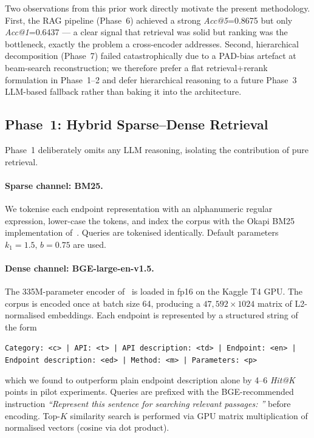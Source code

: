\documentclass[10pt,a4paper,twocolumn]{article}
\begin{document}
Two observations from this prior work directly motivate the present
methodology. First, the RAG pipeline (Phase~6) achieved a strong
\emph{Acc@5}=0.8675 but only \emph{Acc@1}=0.6437 --- a clear signal
that retrieval was solid but ranking was the bottleneck, exactly the
problem a cross-encoder addresses. Second, hierarchical decomposition
(Phase~7) failed catastrophically due to a PAD-bias artefact at
beam-search reconstruction; we therefore prefer a flat
retrieval+rerank formulation in Phase~1--2 and defer hierarchical
reasoning to a future Phase~3 LLM-based fallback rather than baking
it into the architecture.

\subsection{Phase~1: Hybrid Sparse--Dense Retrieval}\label{sec:phase1}

Phase~1 deliberately omits any LLM reasoning, isolating the
contribution of pure retrieval.

\paragraph{Sparse channel: BM25.} We tokenise each endpoint
representation with an alphanumeric regular expression, lower-case the
tokens, and index the corpus with the Okapi BM25 implementation
of~\cite{rankbm25}. Queries are tokenised identically. Default
parameters \(k_1=1.5,\,b=0.75\) are used.

\paragraph{Dense channel: BGE-large-en-v1.5.} The 335M-parameter
encoder of~\cite{xiao2023cpack} is loaded in fp16 on the Kaggle T4
GPU. The corpus is encoded once at batch size 64, producing a
$47{,}592 \times 1024$ matrix of L2-normalised embeddings. Each
endpoint is represented by a structured string of the form
\begin{center}\footnotesize
\texttt{Category: <c> | API: <t> | API description: <td> | Endpoint:
<en> | Endpoint description: <ed> | Method: <m> | Parameters: <p>}
\end{center}
which we found to outperform plain endpoint description alone by 4--6
\emph{Hit@K} points in pilot experiments. Queries are prefixed with
the BGE-recommended instruction
\emph{``Represent this sentence for searching relevant passages: ''}
before encoding. Top-\(K\) similarity search is performed via GPU
matrix multiplication of normalised vectors (cosine via dot product).
\end{document}
